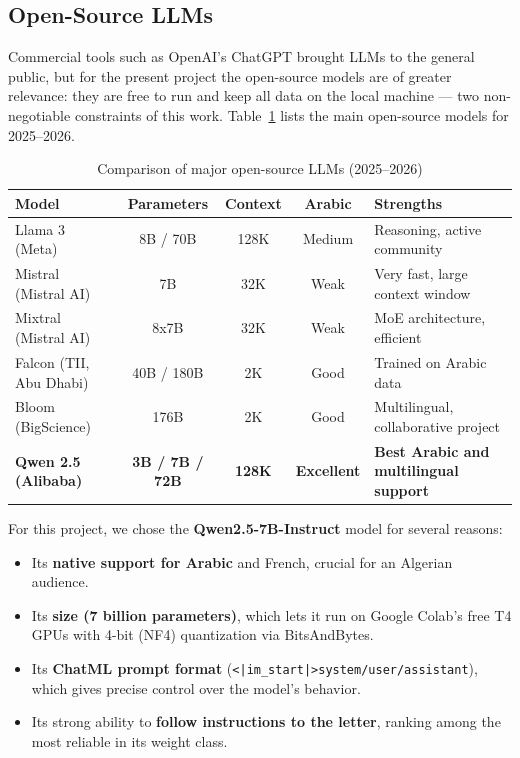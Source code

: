 \documentclass[12pt, a4paper]{report}
\newcommand{\humantext}[1]{#1}      %
\begin{document}
\subsection{Open-Source LLMs}
\humantext{Commercial tools such as OpenAI's ChatGPT brought LLMs to the general public, but for the present project the open-source models are of greater relevance: they are free to run and keep all data on the local machine --- two non-negotiable constraints of this work. Table~\ref{tab:llm_comparison} lists the main open-source models for 2025--2026.}

\begin{table}[H]
\centering
\caption{Comparison of major open-source LLMs (2025--2026)}
\label{tab:llm_comparison}
\begin{tabularx}{\textwidth}{l c c c X}
\toprule
\textbf{Model} & \textbf{Parameters} & \textbf{Context} & \textbf{Arabic} & \textbf{Strengths} \\
\midrule
Llama 3 (Meta) & 8B / 70B & 128K & Medium & Reasoning, active community \\
Mistral (Mistral AI) & 7B & 32K & Weak & Very fast, large context window \\
Mixtral (Mistral AI) & 8x7B & 32K & Weak & MoE architecture, efficient \\
Falcon (TII, Abu Dhabi) & 40B / 180B & 2K & Good & Trained on Arabic data \\
Bloom (BigScience) & 176B & 2K & Good & Multilingual, collaborative project \\
\textbf{Qwen 2.5 (Alibaba)} & \textbf{3B / 7B / 72B} & \textbf{128K} & \textbf{Excellent} & \textbf{Best Arabic and multilingual support} \\
\bottomrule
\end{tabularx}
\end{table}

\humantext{For this project, we chose the \textbf{Qwen2.5-7B-Instruct} model \cite{qwen2025} for several reasons:}
\begin{itemize}[noitemsep]
    \item \humantext{Its \textbf{native support for Arabic} and French, crucial for an Algerian audience.}
    \item \humantext{Its \textbf{size (7 billion parameters)}, which lets it run on Google Colab's free T4 GPUs with 4-bit (NF4) quantization via BitsAndBytes.}
    \item \humantext{Its \textbf{ChatML prompt format} (\texttt{<|im\_start|>system/user/assistant}), which gives precise control over the model's behavior.}
    \item \humantext{Its strong ability to \textbf{follow instructions to the letter}, ranking among the most reliable in its weight class.}
\end{itemize}
\end{document}
